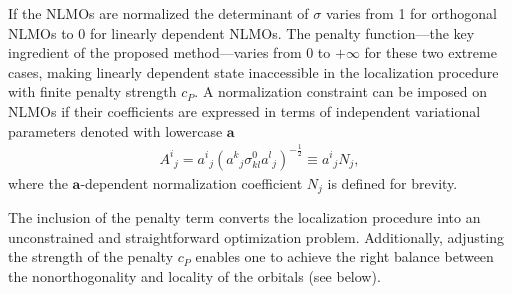 \documentclass[aps,prl,reprint,amsmath,amssymb]{revtex4-1}
\begin{document}
If the NLMOs are normalized the determinant of $\sigma$ varies from 1 for orthogonal NLMOs to 0 for linearly dependent NLMOs. The penalty function---the key ingredient of the proposed method---varies from 0 to $+\infty$ for these two extreme cases, making linearly dependent state inaccessible in the localization procedure with finite penalty strength $c_P$. 
A normalization constraint can be imposed on NLMOs if their coefficients are expressed in terms of independent variational parameters denoted with lowercase $\mathbf{a}$
%
\begin{equation}
\begin{split}
{A^i}_j = {a^i}_{j} ({a^k}_{j} \sigma^0_{kl}{a^l}_{j})^{-\frac{1}{2}} \equiv {a^i}_{j} N_j ,
\end{split}
\end{equation}
%
where the $\mathbf{a}$-dependent normalization coefficient $N_j$ is defined for brevity. 

The inclusion of the penalty term converts the localization procedure into an unconstrained and straightforward optimization problem. Additionally, adjusting the strength of the penalty $c_P$ enables one to achieve the right balance between the nonorthogonality and locality of the orbitals (see below). 
\end{document}
